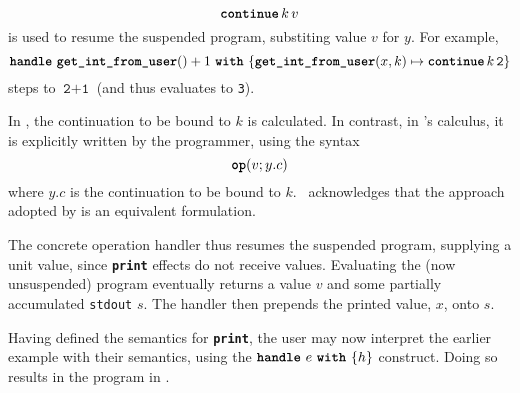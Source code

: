 \[\textbf{\texttt{continue}} \, {k} \, {v}\] 
is used to resume the suspended program, substiting value $v$ for $y$. For example,  
\[\textbf{\texttt{handle}} \,\, {\textbf{\texttt{get\_int\_from\_user}}() + 1} \,\, \textbf{\texttt{with}} \,\, \{{\textbf{\texttt{get\_int\_from\_user}}(x, k) \mapsto \textbf{\texttt{continue}} \, {k} \, {\texttt{2}}}\}\]
steps to $\texttt{2} + \texttt{1}$ (and thus evaluates to \texttt{3}).

In \efflang{}, the continuation to be bound to $k$ is calculated. In contrast, in \citeauthor{pretnar-15}'s calculus, it is explicitly written by the programmer, using the syntax 
\[\textbf{\texttt{op}}({v; y.c})\]
where $y.c$ is the continuation to be bound to $k$.\ \citeauthor{pretnar-15} acknowledges that the approach adopted by \efflang{} is an equivalent formulation.

The concrete operation handler thus resumes the suspended program, supplying a unit value, since \textbf{\texttt{print}} effects do not receive values. Evaluating the (now unsuspended) program eventually returns a value $v$ and some partially accumulated \texttt{stdout} $s$. The handler then prepends the printed value, $x$, onto $s$. 



% 
Having defined the semantics for \textbf{\texttt{print}}, the user may now interpret the earlier example with their semantics, using the $\textbf{\texttt{handle}} \,\, {e} \,\, \textbf{\texttt{with}} \,\, \{{h}\}$ construct. Doing so results in the program in .


